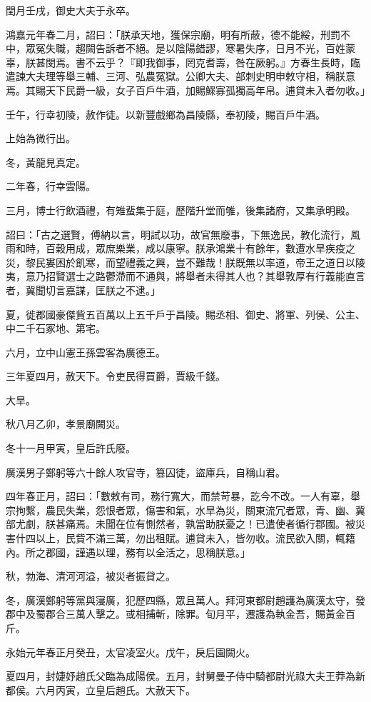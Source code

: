 \begin{pinyinscope}
閏月壬戌，御史大夫于永卒。

鴻嘉元年春二月，詔曰：「朕承天地，獲保宗廟，明有所蔽，德不能綏，刑罰不中，眾冤失職，趨闕告訴者不絕。是以陰陽錯謬，寒暑失序，日月不光，百姓蒙辜，朕甚閔焉。書不云乎？『即我御事，罔克耆壽，咎在厥躬。』方春生長時，臨遣諫大夫理等舉三輔、三河、弘農冤獄。公卿大夫、部刺史明申敕守相，稱朕意焉。其賜天下民爵一級，女子百戶牛酒，加賜鰥寡孤獨高年帛。逋貸未入者勿收。」

壬午，行幸初陵，赦作徒。以新豐戲鄉為昌陵縣，奉初陵，賜百戶牛酒。

上始為微行出。

冬，黃龍見真定。

二年春，行幸雲陽。

三月，博士行飲酒禮，有雉蜚集于庭，歷階升堂而雊，後集諸府，又集承明殿。

詔曰：「古之選賢，傅納以言，明試以功，故官無廢事，下無逸民，教化流行，風雨和時，百穀用成，眾庶樂業，咸以康寧。朕承鴻業十有餘年，數遭水旱疾疫之災，黎民婁困於飢寒，而望禮義之興，豈不難哉！朕既無以率道，帝王之道日以陵夷，意乃招賢選士之路鬱滯而不通與，將舉者未得其人也？其舉敦厚有行義能直言者，冀聞切言嘉謀，匡朕之不逮。」

夏，徙郡國豪傑貲五百萬以上五千戶于昌陵。賜丞相、御史、將軍、列侯、公主、中二千石冢地、第宅。

六月，立中山憲王孫雲客為廣德王。

三年夏四月，赦天下。令吏民得買爵，賈級千錢。

大旱。

秋八月乙卯，孝景廟闕災。

冬十一月甲寅，皇后許氏廢。

廣漢男子鄭躬等六十餘人攻官寺，篡囚徒，盜庫兵，自稱山君。

四年春正月，詔曰：「數敕有司，務行寬大，而禁苛暴，訖今不改。一人有辜，舉宗拘繫，農民失業，怨恨者眾，傷害和氣，水旱為災，關東流冗者眾，青、幽、冀部尤劇，朕甚痛焉。未聞在位有惻然者，孰當助朕憂之！已遣使者循行郡國。被災害什四以上，民貲不滿三萬，勿出租賦。逋貸未入，皆勿收。流民欲入關，輒籍內。所之郡國，謹遇以理，務有以全活之，思稱朕意。」

秋，勃海、清河河溢，被災者振貸之。

冬，廣漢鄭躬等黨與寖廣，犯歷四縣，眾且萬人。拜河東都尉趙護為廣漢太守，發郡中及蜀郡合三萬人擊之。或相捕斬，除罪。旬月平，遷護為執金吾，賜黃金百斤。

永始元年春正月癸丑，太官凌室火。戊午，戾后園闕火。

夏四月，封婕妤趙氏父臨為成陽侯。五月，封舅曼子侍中騎都尉光祿大夫王莽為新都侯。六月丙寅，立皇后趙氏。大赦天下。


\end{pinyinscope}
